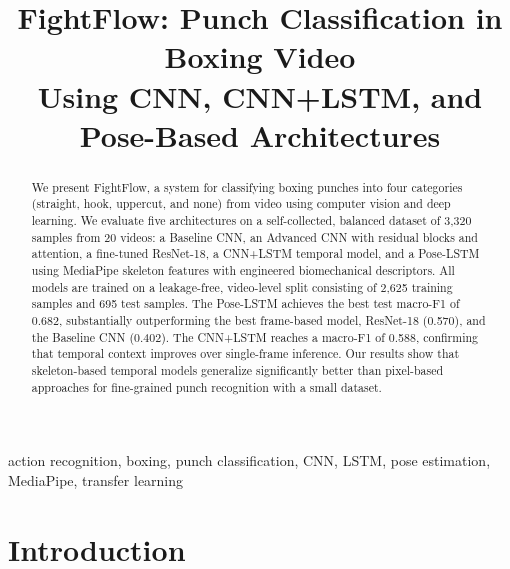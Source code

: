 \documentclass[conference]{IEEEtran}
\begin{document}
\title{FightFlow: Punch Classification in Boxing Video\\
Using CNN, CNN+LSTM, and Pose-Based Architectures}

\author{
  \and
}

\maketitle

\begin{abstract}
We present FightFlow, a system for classifying boxing punches into four
categories (straight, hook, uppercut, and none) from video using computer
vision and deep learning. We evaluate five architectures on a self-collected,
balanced dataset of 3,320 samples from 20 videos: a Baseline CNN, an Advanced
CNN with residual blocks and attention, a fine-tuned ResNet-18, a CNN+LSTM
temporal model, and a Pose-LSTM using MediaPipe skeleton features with
engineered biomechanical descriptors. All models are trained on a
leakage-free, video-level split consisting of 2,625 training samples and 695
test samples. The Pose-LSTM achieves the best test macro-F1 of 0.682,
substantially outperforming the best frame-based model, ResNet-18 (0.570),
and the Baseline CNN (0.402). The CNN+LSTM reaches a macro-F1 of 0.588,
confirming that temporal context improves over single-frame inference. Our
results show that skeleton-based temporal models generalize significantly
better than pixel-based approaches for fine-grained punch recognition with a
small dataset.
\end{abstract}

\begin{IEEEkeywords}
action recognition, boxing, punch classification, CNN, LSTM, pose estimation,
MediaPipe, transfer learning
\end{IEEEkeywords}

\section{Introduction}
\end{document}

